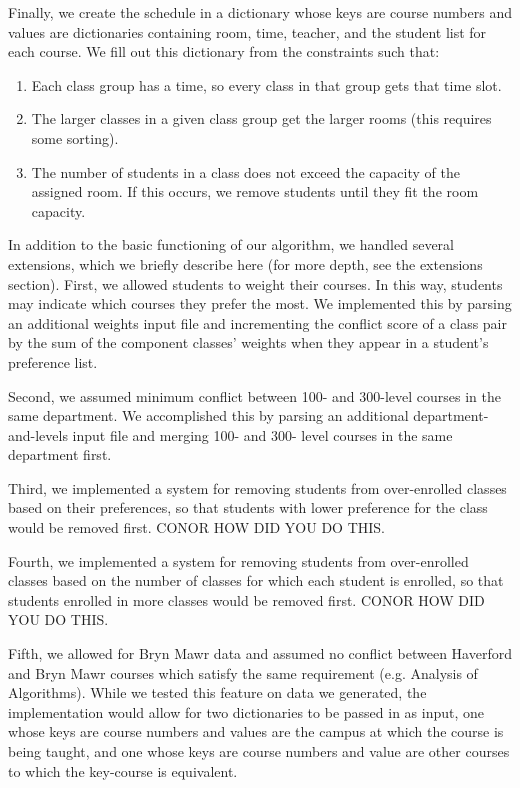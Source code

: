 \documentclass[11pt, oneside]{article}   	%
\begin{document}
Finally, we create the schedule in a dictionary whose keys are course numbers and values are dictionaries containing room, time, teacher, and the student list for each course. We fill out this dictionary from the constraints such that:
\begin{enumerate}
    \item Each class group has a time, so every class in that group gets that time slot.
    \item The larger classes in a given class group get the larger rooms (this requires some sorting).
    \item The number of students in a class does not exceed the capacity of the assigned room. If this occurs, we remove students until they fit the room capacity.
\end{enumerate}

In addition to the basic functioning of our algorithm, we handled several extensions, which we briefly describe here (for more depth, see the extensions section). First, we allowed students to weight their courses. In this way, students may indicate which courses they prefer the most. We implemented this by parsing an additional weights input file and incrementing the conflict score of a class pair by the sum of the component classes' weights when they appear in a student's preference list.

Second, we assumed minimum conflict between 100- and 300-level courses in the same department. We accomplished this by parsing an additional department-and-levels input file and merging 100- and 300- level courses in the same department first.

Third, we implemented a system for removing students from over-enrolled classes based on their preferences, so that students with lower preference for the class would be removed first. CONOR HOW DID YOU DO THIS.

Fourth, we implemented a system for removing students from over-enrolled classes based on the number of classes for which each student is enrolled, so that students enrolled in more classes would be removed first. CONOR HOW DID YOU DO THIS.

Fifth, we allowed for Bryn Mawr data and assumed no conflict between Haverford and Bryn Mawr courses which satisfy the same requirement (e.g. Analysis of Algorithms).  While we tested this feature on data we generated, the implementation would allow for two dictionaries to be passed in as input, one whose keys are course numbers and values are the campus at which the course is being taught, and one whose keys are course numbers and value are other courses to which the key-course is equivalent.
\end{document}
